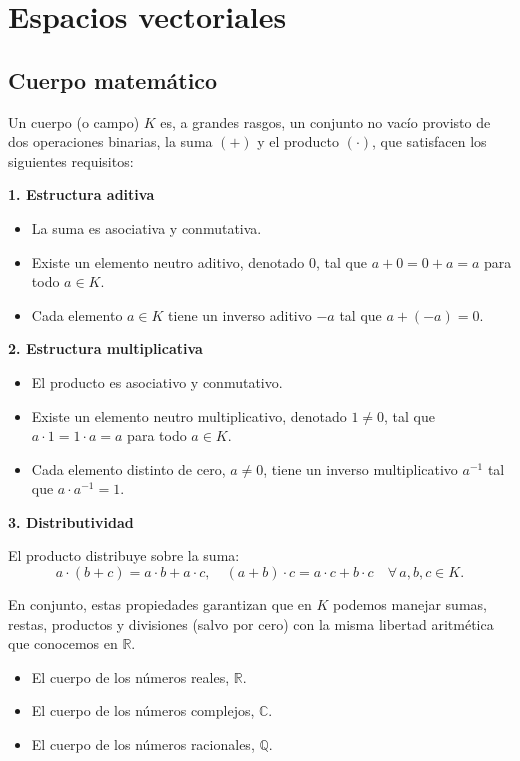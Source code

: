 \section{Espacios vectoriales}

\subsection{Cuerpo matemático}

Un cuerpo (o campo) \(K\) es, a grandes rasgos, un conjunto no vacío provisto de dos operaciones binarias, la suma \((+)\) y el producto \((\cdot)\), que satisfacen los siguientes requisitos:

\noindent \textbf{1. Estructura aditiva}
\begin{itemize}
  \item La suma es asociativa y conmutativa.
  \item Existe un elemento neutro aditivo, denotado \(0\), tal que \(a+0=0+a=a\) para todo \(a\in K\).
  \item Cada elemento \(a\in K\) tiene un inverso aditivo \(-a\) tal que \(a+(-a)=0\).
\end{itemize}

\noindent \textbf{2. Estructura multiplicativa}
\begin{itemize}
  \item El producto es asociativo y conmutativo.
  \item Existe un elemento neutro multiplicativo, denotado \(1\neq 0\), tal que \(a\cdot 1 = 1\cdot a = a\) para todo \(a\in K\).
  \item Cada elemento distinto de cero, \(a\neq 0\), tiene un inverso multiplicativo \(a^{-1}\) tal que \(a\cdot a^{-1}=1\).
\end{itemize}

\noindent \textbf{3. Distributividad}

El producto distribuye sobre la suma:
\[
  a\cdot(b+c) = a\cdot b + a\cdot c,\quad
  (a+b)\cdot c = a\cdot c + b\cdot c
  \quad\forall\,a,b,c\in K.
\]

En conjunto, estas propiedades garantizan que en \(K\) podemos manejar sumas, restas, productos y divisiones (salvo por cero) con la misma libertad aritmética que conocemos en \(\mathbb{R}\).

\begin{itemize}
  \item El cuerpo de los números reales, \(\mathbb{R}\).
  \item El cuerpo de los números complejos, \(\mathbb{C}\).
  \item El cuerpo de los números racionales, \(\mathbb{Q}\).
\end{itemize}

